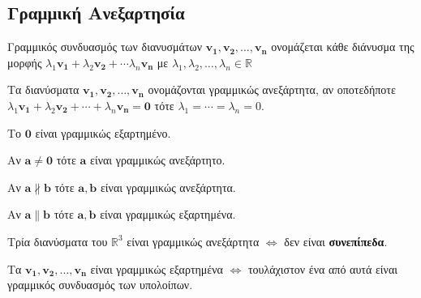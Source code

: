\documentclass[a4paper,table]{report}
\begin{document}
{  \subsection*{Γραμμική Ανεξαρτησία}
  \begin{myitemize}[leftmargin=*]
    \item \textcolor{Col1}{Γραμμικός συνδυασμός} των διανυσμάτων $ \mathbf{v_{1}},
      \mathbf{v_{2}}, \ldots, \mathbf{v_{n}} $ 
      ονομάζεται κάθε διάνυσμα της μορφής 
      $\lambda_{1} \mathbf{v_{1}}+ \lambda_{2} \mathbf{v_{2}} + \cdots
      \lambda _{n}\mathbf{v_{n}} $ με 
      $ \lambda_{1}, \lambda_{2}, \ldots, \lambda_{n} \in \mathbb{R} $ 
    \item Τα διανύσματα $ \mathbf{v_{1}}, \mathbf{v_{2}}, \ldots, \mathbf{v_{n}} $ 
      ονομάζονται \textcolor{Col1}{γραμμικώς ανεξάρτητα}, αν 
      οποτεδήποτε $\lambda_{1} \mathbf{v_{1}} + \lambda_{2}
      \mathbf{v_{2}} + \cdots + \lambda_{n} \mathbf{v_{n}} \! = \mathbf{0} $ τότε
      $ \lambda_{1} = \cdots = \lambda_{n} \! = 0$. 
    \item Το $ \mathbf{0} $ είναι γραμμικώς εξαρτημένο.
    \item Αν $ \mathbf{a} \neq \mathbf{0} $ τότε $ \mathbf{a}$ 
      είναι γραμμικώς ανεξάρτητο.
    \item Αν $ \mathbf{a} \nparallel \mathbf{b} $ τότε $\mathbf{a}, \mathbf{b} $ 
      είναι γραμμικώς ανεξάρτητα.
    \item Αν $ \mathbf{a} \parallel \mathbf{b} $ τότε $\mathbf{a}, \mathbf{b} $ 
      είναι γραμμικώς εξαρτημένα.
    \item Τρία διανύσματα του $ \mathbb{R}^{3} $ είναι γραμμικώς ανεξάρτητα $
      \Leftrightarrow $ δεν είναι \textbf{συνεπίπεδα}.
    \item Τα $ \mathbf{v_{1}}, \mathbf{v_{2}}, \ldots, \mathbf{v_{n}} $ είναι
      γραμμικώς εξαρτημένα $ \Leftrightarrow $ τουλάχιστον ένα από αυτά είναι γραμμικός 
      συνδυασμός των υπολοίπων.
  \end{myitemize}
}
\end{document}
